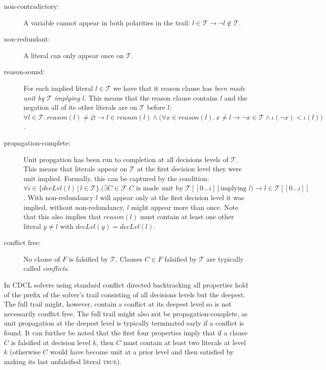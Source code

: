 \documentclass[runningheads]{llncs}
\newcommand{\trail}{\ensuremath{\mathcal{T}}}
\newcommand{\trailIdx}[1]{\ensuremath{\iota(#1)}}
\newcommand{\range}[2]{#1\ldots#2}
\newcommand{\dlevel}[1]{\ensuremath{\mathit{decLvl}(#1)}}
\newcommand{\true}{\textsc{true}\xspace}
\newcommand{\reason}[1]{\ensuremath{\mathit{reason}(#1)}}
\newcommand{\formula}{\ensuremath{\mathcal{F}}}
\renewcommand{\implies}{\rightarrow}
\begin{document}
\begin{description}
\item[non-contradictory:] A variable cannot appear in both polarities
    in the trail: $l\in \trail\implies \lnot l \not \in \trail$.
\item[non-redundant:] A literal can only appear once on $\trail$.
\item[reason-sound:] For each implied literal $l\in\trail$ we have
    that it reason clause has \emph{been made unit by $\trail$
      implying $l$}. This means that the reason clause contains $l$
    and the negation all of its other literals are on $\trail$ before
    $l$:
    $\forall l\in\trail.\, \reason{l}\neq \varnothing \implies
    l\in\reason{l} \land \bigl(\forall x\in\reason{l}.\, x\neq l
    \implies \lnot x \in \trail \land \trailIdx{\lnot x} <
    \trailIdx{l}\bigr)$.
\item[propagation-complete:] Unit propgation has been run to
    completion at all decisions levels of $\trail$. This means that
    literals appear on $\trail$ at the first decision level they were
    unit implied. Formally, this can be captured by the condition:
    $\forall i \in \{\dlevel{l}\,|\,l\in \trail\}. \bigl(\exists
    C\in\formula. \mbox{$C$ is made unit by $\trail[[\range{0}{i}]]$
      implying $l$}\bigr) \implies l\in \trail[[\range{0}{i}]]$. With
    non-redundancy $l$ will appear only at the first decision level it
    was implied, without non-redundancy, $l$ might appear more than
    once. Note that this also implies that $\reason{l}$ must contain
    at least one other literal $y\neq l$ with
    $\dlevel{y} = \dlevel{l}$.
\item[conflict free:] No clause of $F$ is falsified by
    $\trail$. Clauses $C\in F$ falsified by $\trail$ are typically
    called \emph{conflicts}.
\end{description}

In CDCL solvers using standard conflict directed backtracking all
properties hold of the prefix of the solver's trail consisting of all
decisions levels but the deepest. The full trail might, however,
contain a conflict at its deepest level so is not necessarily conflict
free. The full trail might also not be propagation-complete, as unit
propagation at the deepest level is typically terminated early if a
conflict is found. It can further be noted that the first four
properties imply that if a clause $C$ is falsified at decision level
$k$, then $C$ must contain at least two literals at level $k$
(otherwise $C$ would have become unit at a prior level and then
satisfied by making its last unfalsified literal \true).
\end{document}
